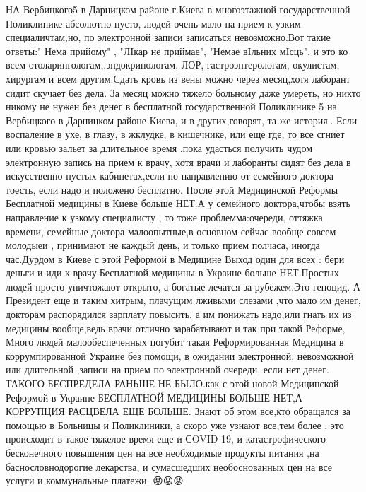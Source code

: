 НА Вербицкого5 в Дарницком районе г.Киева в многоэтажной государственной
Поликлинике абсолютно пусто, людей очень мало на прием к узким специаличтам,но,
по электронной записи записаться невозможно.Вот такие ответы:" Нема прийому" ,
"ЛIкар не приймае", "Немае вIльних мIсць", и это ко всем
отоларингологам,,эндокринологам, ЛОР, гастроэнтерологам, окулистам, хирургам и
всем другим.Сдать кровь из вены можно через месяц,хотя лаборант сидит скучает
без дела.  За месяц можно тяжело больному даже умереть, но никто никому не
нужен без денег в бесплатной государственной Поликлинике 5 на Вербицкого в
Дарницком районе Киева, и в других,говорят, та же история.. Если воспаление в
ухе, в глазу, в жклудке, в кишечнике, или еще где, то все сгниет или кровью
зальет за длительное время .пока удасться получить чудом электронную запись на
прием к врачу, хотя врачи и лаборанты сидят без дела в искусственно пустых
кабинетах,если по направлению от семейного доктора тоесть, если надо и положено
бесплатно. После этой Медицинской Реформы Бесплатной медицины в Киеве больше
НЕТ.А у семейного доктора,чтобы взять направление к узкому специалисту , то
тоже проблемма:очереди, оттяжка времени, семейные доктора малоопытные,в
основном сейчас вообще совсем  молодыеи , принимают не каждый день,  и только
прием полчаса, иногда час.Дурдом в Киеве с этой Реформой в Медицине Выход один
для всех : бери деньги и иди к врачу.Бесплатной медицины в Украине больше
НЕТ.Простых людей просто уничтожают открыто, а богатые лечатся за рубежем.Это
геноцид. А Президент еще и таким хитрым, плачущим лживыми слезами ,что мало им
денег, докторам распорядился зарплату повысить, а им понижать надо,или гнать их
из медицины вообще,ведь  врачи отлично зарабатывают  и так при такой Реформе,
Много людей  малообеспеченных погубит такая Реформированная Медицина в
коррумпированной Украине без помощи, в ожидании электронной, невозможной или
длительной ,записи на прием по электронной очереди, если нет денег. ТАКОГО
БЕСПРЕДЕЛА РАНЬШЕ НЕ БЫЛО.как с этой новой Медицинской Реформой в Украине
БЕСПЛАТНОЙ МЕДИЦИНЫ БОЛЬШЕ НЕТ,А КОРРУПЦИЯ РАСЦВЕЛА ЕЩЕ БОЛЬШЕ. Знают об этом
все,кто обращался за помощью в Больницы и Поликлиники, а скоро  уже узнают
все,тем более , это происходит в такое тяжелое время еще и СOVID-19, и
катастрофического бесконечного  повышения цен на все необходимые продукты
питания ,на баснословнодорогие  лекарства, и сумасшедших необоснованных цен на
все услуги и коммунальные платежи. 😡😡😡

